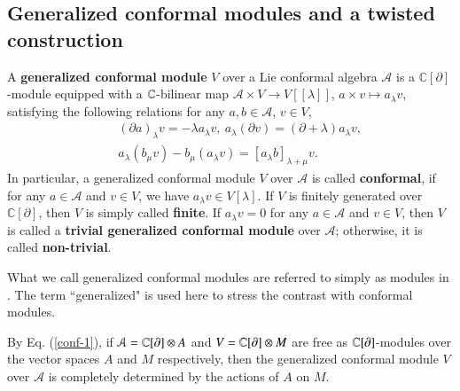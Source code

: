 \documentclass[12pt]{amsart}
\begin{document}
\subsection{Generalized conformal modules and a twisted construction}
\begin{defi}\cite{K1}
A {\bf generalized conformal module} $V$ over a Lie conformal algebra $\mathcal {A}$
is a $\mathbb{C}[\partial]$-module equipped with a $\mathbb{C}$-bilinear map
$\mathcal {A}\times V\rightarrow
V[[\lambda]]$, $a\times v\mapsto a_\lambda v$, satisfying the following relations for any $a,b\in\mathcal {A}$, $v\in V$,
\begin{eqnarray}
&&\label{conf-1}(\partial a)_\lambda v=-\lambda a_\lambda v,\ a_\lambda(\partial
v)=(\partial+\lambda)a_\lambda v,\\
&&\label{conf-2}a_\lambda(b_\mu v)-b_\mu(a_\lambda v)=[a_\lambda b]_{\lambda+\mu}v.
\end{eqnarray}
In particular, a generalized conformal module $V$ over $\mathcal {A}$ is called {\bf conformal}, if for any $a\in \mathcal {A}$ and $v\in V$, we have
$a_\lambda v\in V[\lambda]$.
If $V$ is finitely generated over $\mathbb{C}[\partial]$, then $V$ is simply called {\bf finite}. If $a_\lambda v=0$ for any $a\in \mathcal {A}$ and $v\in V$, then $V$ is called a {\bf trivial generalized conformal module} over $\mathcal {A}$; otherwise, it is called {\bf non-trivial}.
\end{defi}

\begin{rmk}
What we call generalized conformal modules are referred to simply as modules  in \cite{K1}. The term ``generalized" is used here to stress the contrast with conformal modules.

By Eq. (\ref{conf-1}), if $\mathcal {A}=\mathbb{C}[\partial]\otimes A$ and $V=  \mathbb{C}[\partial]\otimes M$ are free as $\mathbb{C}[\partial]$-modules over the vector spaces $A$ and $M$ respectively,  then  the generalized conformal module $V$ over $\mathcal {A}$ is completely determined by the actions of $A$ on $M$.

\end{rmk}
\end{document}
